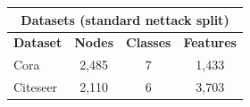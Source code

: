 \documentclass[border=14pt]{standalone}
\begin{document}
\small
\begin{tabular}{@{}lccc@{}}
\multicolumn{4}{c}{\normalsize\textbf{Datasets (standard nettack split)}}\\[5pt]
\toprule
\textbf{Dataset} & \textbf{Nodes} & \textbf{Classes} & \textbf{Features}\\
\midrule
Cora     & 2{,}485 & 7 & 1{,}433\\
Citeseer & 2{,}110 & 6 & 3{,}703\\
\bottomrule
\end{tabular}
\end{document}
